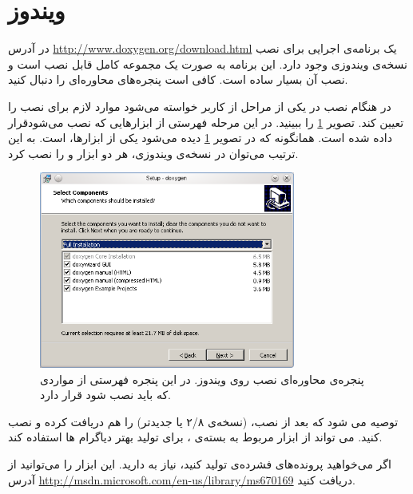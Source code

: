 \section{ویندوز}
\begin{sloppypar}
در آدرس 
\url{http://www.doxygen.org/download.html} 
یک برنامه‌ی اجرایی برای نصب نسخه‌ی ویندوزی وجود دارد. این برنامه به صورت یک مجموعه کامل قابل نصب است و نصب آن بسیار ساده است. 
کافی است پنجره‌های محاوره‌ای را دنبال کنید.
\end{sloppypar}

در هنگام نصب در یکی از مراحل از کاربر خواسته می‌شود موارد لازم برای نصب را تعیین کند. 
تصویر \ref{پنجره_نصب_روی_ویندوز} را ببینید. در این مرحله 
فهرستی از ابزارهایی که نصب می‌شودقرار داده شده است. 
همانگونه که در تصویر \ref{پنجره_نصب_روی_ویندوز} دیده می‌شود یکی از ابزارها،  است. 
به این ترتیب می‌توان در نسخه‌ی ویندوزی، هر دو ابزار  و  را نصب کرد.

\begin{figure}
\centering
\includegraphics[width=0.75\textwidth]{image/windows_setup}
\caption[
پنجره‌ی محاوره‌ای نصب
{}
 روی ویندوز
]{
پنجره‌ی محاوره‌ای نصب
{}
 روی ویندوز. در این پنجره فهرستی از مواردی که باید نصب شود قرار دارد.
}
\label{پنجره_نصب_روی_ویندوز}
\end{figure}

توصیه می شود که بعد از نصب، 
(نسخه‌ی ۲/۸ یا جدیدتر) را هم دریافت کرده و نصب کنید. 
 می تواند از ابزار 
 مربوط به بسته‌ی 
، برای تولید بهتر دیاگرام ها استفاده کند.

\begin{sloppypar}
اگر می‌خواهید پرونده‌های فشرده‌ی  تولید کنید، نیاز به 
دارید. این ابزار را می‌توانید از آدرس 
\url{http://msdn.microsoft.com/en-us/library/ms670169}
 دریافت کنید.
\end{sloppypar}

